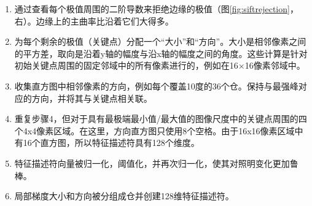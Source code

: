 \begin{enumerate}

\item 通过查看每个极值周围的二阶导数来拒绝边缘的极值（图\ref{fig:siftrejection}，右）。边缘上的主曲率比沿着它们大得多。
\item 为每个剩余的极值（关键点）分配一个“大小”和“方向”。大小是相邻像素之间的平方差，取向是沿着y轴的幅度与沿x轴的幅度之间的角度。这些计算是针对初始关键点周围的固定邻域中的所有像素进行的，例如在16×16像素邻域中。
\item 收集直方图中相邻像素的方向，例如每个覆盖10度的36个仓。保持与最强峰对应的方向，并将其与关键点相关联。
\item 重复步骤4，但对于具有最极端最小值/最大值的图像尺度中的关键点周围的四个4x4像素区域。在这里，方向直方图只使用8个空格。由于16x16像素区域中有16个直方图，所以特征描述符具有128个维度。
\item 特征描述符向量被归一化，阈值化，并再次归一化，使其对照明变化更加鲁棒。
\item 局部梯度大小和方向被分组成仓并创建128维特征描述符。

\end{enumerate}

